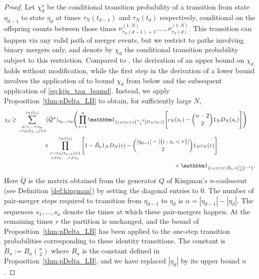 \begin{proof}
Let $\chi^\star_d$ be the conditional transition probability of a transition from state $\eta_{d-1}$ to state $\eta_d$ at times $\tau_N(t_{d-1})$ and $\tau_N(t_d)$ respectively, conditional on the offspring counts between those times $\nu^{(1:N)}_{\tau_N(d-1) +1} , \dots, \nu^{(1:N)}_{\tau_N(d)}$. 
This transition can happen via any valid path of merger events, but we restrict to paths involving binary mergers only, and denote by $\chi_d$ the conditional transition probability subject to this restriction.
Compared to \textcite[Proof of Theorem 1]{koskela2018}, the derivation of an upper bound on $\chi_d$ holds without modification, while the first step in the derivation of a lower bound \parencite[p.14]{koskela2018} involves the application of \textcite[Lemma 1 Case 1]{koskela2018} to bound $\chi_d$ from below and the subsequent application of \eqref{eq:kjjs_tau_bound}.
Instead, we apply Proposition~\ref{thm:pDelta_LB} to obtain, for sufficiently large $N$,
\begin{align*}
\chi_d 
&\geq \sum_{\substack{ s_1 < \ldots < s_{ \alpha } 
        \\= \tau_N( t_{ d - 1 } ) + 1 }}^{ \tau_N( t_d ) } 
        ( \tilde{ Q }^{ \alpha } )_{ \eta_{ d - 1 } \eta_d } 
        \Bigg( \prod_{ r = 1 }^{ \alpha } \I{ c_N(s_r) > \binom{n-2}{2} D_N(s_r) }
        \Bigg[ c_N( s_r ) - \binom{ n - 2 }{ 2 } \ON D_N( s_r ) \Bigg] \Bigg) \\
    &\hspace{2cm} \times \prod_{ \substack{ r = \tau_N( t_{ d - 1 } ) + 1 
        \\ r \neq s_1, \ldots, r \neq s_{ \alpha } } }^{ \tau_N( t_d ) } 
        \Bigg[ 1 - \tilde{B}_n \ON D_N( r ) 
        - \binom{ | \eta_{ d - 1 } | - | \{ i : s_i < r \} | }{ 2 } \ON c_N( r ) \Bigg] \\
    &\hspace{10cm}\times \I{ c_N(r) < (\tilde{B}_n + \binom{n}{2})^{-1} } .
\end{align*}
Here $\tilde{Q}$ is the matrix obtained from the generator $Q$ of Kingman's $n$-coalescent (see Definition \ref{def:kingman}) by setting the diagonal entries to 0.
The number of pair-merger steps required to transition from $\eta_{d-1}$ to $\eta_d$ is $\alpha = |\eta_{d-1}| - |\eta_d|$. The sequences $s_1,\dots,s_\alpha$ denote the times at which these pair-mergers happen. 
At the remaining times $r$ the partition is unchanged, and the bound of Proposition~\ref{thm:pDelta_LB} has been applied to the one-step transition probabilities corresponding to these identity transitions. 
The constant is $\tilde{B}_n := B_n\binom{n}{2}$ where $B_n$ is the constant defined in Proposition~\ref{thm:pDelta_LB}, and we have replaced $|\eta_d|$ by its upper bound $n$.


\end{proof}
